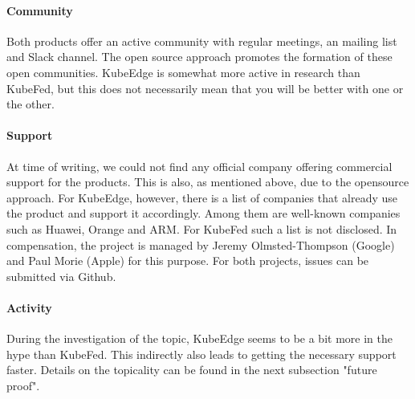 \documentclass[MSC,Master,english]{twbook}%
\begin{document}
\paragraph{Community} Both products offer an active community with regular meetings, an mailing list and Slack channel. The open source approach promotes the formation of these open communities. KubeEdge is somewhat more active in research than KubeFed, but this does not necessarily mean that you will be better with one or the other.

\paragraph{Support} At time of writing, we could not find any official company offering commercial support for the products. This is also, as mentioned above, due to the opensource approach. For KubeEdge, however, there is a list of companies that already use the product and support it accordingly. Among them are well-known companies such as Huawei, Orange and ARM. For KubeFed such a list is not disclosed. In compensation, the project is managed by Jeremy Olmsted-Thompson (Google) and Paul Morie (Apple) for this purpose. For both projects, issues can be submitted via Github.

\paragraph{Activity} During the investigation of the topic, KubeEdge seems to be a bit more in the hype than KubeFed. This indirectly also leads to getting the necessary support faster. Details on the topicality can be found in the next subsection "future proof".
\end{document}
